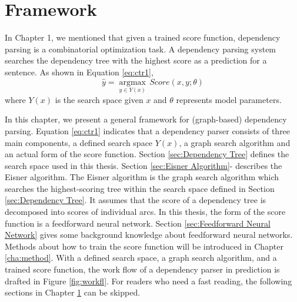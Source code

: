 
\chapter{Framework}
\label{cha:Basic Concepts}
In Chapter 1, we mentioned that given a trained score function, dependency parsing is a combinatorial optimization task. A dependency parsing system searches the dependency tree with the highest score as a prediction for a sentence. As shown in Equation \ref{eq:ctr1},
\begin{equation}
\label{eq:ctr1}
\hat{y}=\underset{y\in Y(x)}{\operatorname{argmax}}\,Score(x,y;\theta)
\end{equation}   
where $Y(x)$ is the search space given $x$ and $\theta$ represents model parameters.

In this chapter, we present a general framework for (graph-based) dependency parsing. Equation \ref{eq:ctr1} indicates that a dependency parser consists of three main components, a defined search space $Y(x)$, a graph search algorithm and an actual form of the score function.  Section \ref{sec:Dependency Tree} defines the search space used in this thesis. Section \ref{sec:Eisner Algorithm}- describes the Eisner algorithm. The Eisner algorithm is the graph search algorithm which searches the highest-scoring tree within the search space defined in Section \ref{sec:Dependency Tree}. It assumes that the score of a dependency tree is decomposed into scores of individual arcs.  
In this thesis, the form of the score function is a feedforward neural network. Section \ref{sec:Feedforward Neural Network} gives some background knowledge about feedforward neural networks. Methods about how to train the score function will be introduced in Chapter \ref{cha:method}. With a defined search space, a graph search algorithm, and a trained score function, the work flow of a dependency parser in prediction is drafted in Figure \ref{fig:workfl}. For readers who need a fast reading, the following sections in Chapter \ref{cha:Basic Concepts} can be skipped.

